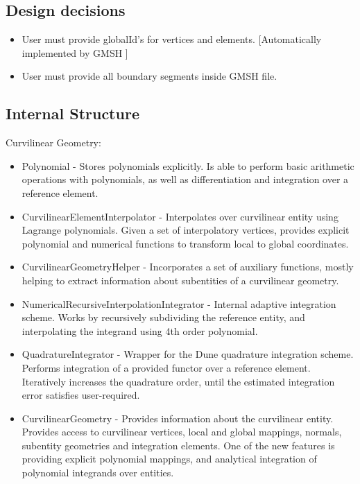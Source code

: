 \subsection{Design decisions}
\label{section-outline-designdecisions}

\begin{itemize}
	\item User must provide globalId's for vertices and elements. [Automatically implemented by GMSH \citeGMSH]
	\item User must provide all boundary segments inside GMSH file.
\end{itemize}


\subsection{Internal Structure}
\label{section-outline-internalstructure}


Curvilinear Geometry:
\begin{itemize}
	\item Polynomial - Stores polynomials explicitly. Is able to perform basic arithmetic operations with polynomials, as well as differentiation and integration over a reference element.
	\item CurvilinearElementInterpolator - Interpolates over curvilinear entity using Lagrange polynomials. Given a set of interpolatory vertices, provides explicit polynomial and numerical functions to transform local to global coordinates.
	\item CurvilinearGeometryHelper - Incorporates a set of auxiliary functions, mostly helping to extract information about subentities of a curvilinear geometry.
	\item NumericalRecursiveInterpolationIntegrator - Internal adaptive integration scheme. Works by recursively subdividing the reference entity, and interpolating the integrand using 4th order polynomial.
	\item QuadratureIntegrator - Wrapper for the Dune quadrature integration scheme. Performs integration of a provided functor over a reference element. Iteratively increases the quadrature order, until the estimated integration error satisfies user-required.
	\item CurvilinearGeometry - Provides information about the curvilinear entity. Provides access to curvilinear vertices, local and global mappings, normals, subentity geometries and integration elements. One of the new features is providing explicit polynomial mappings, and analytical integration of polynomial integrands over entities.
\end{itemize}

